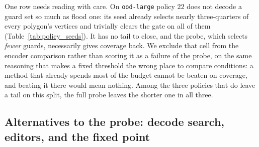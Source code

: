 \documentclass[11pt]{article}
\newcommand{\Covf}[1]{\mathrm{Cov}_P(#1)}
\newcommand{\OPT}{\mathrm{OPT}}
\begin{document}
One row needs reading with care. On \texttt{ood-large} policy $22$ does not decode a guard set so much as flood one: its seed already selects nearly three-quarters of every polygon's vertices and trivially clears the gate on all of them (Table~\ref{tab:policy_seeds}). It has no tail to close, and the probe, which selects \emph{fewer} guards, necessarily gives coverage back. We exclude that cell from the encoder comparison rather than scoring it as a failure of the probe, on the same reasoning that makes a fixed threshold the wrong place to compare conditions: a method that already spends most of the budget cannot be beaten on coverage, and beating it there would mean nothing. Among the three policies that do leave a tail on this split, the full probe leaves the shorter one in all three.

\begin{table}[!ht]
  \centering
  \footnotesize
  \caption{Replication across the three PO/BT policies trained from scratch under the same recipe (seeds $11$, $22$, $33$), $t = 0.20$, coverage by exact CGAL. Each policy has its own full and no-encoder probe trained on its own targets; the released policy ($1234$) is tabulated in Tables~\ref{tab:headline}, \ref{tab:ood} and~\ref{tab:large} and is not repeated here. ``gate'' is $\#\{\Covf{S} \ge 0.95\}/N$. $^{\dagger}$On \texttt{ood-large} the $|S|/\OPT$ column averages only the $206$ of $285$ polygons that have a vertex-guard optimum, so it is not comparable across splits; the other columns cover all $285$. At this fixed threshold the coverage and cost columns are interdependent; the encoder conclusion is drawn at matched budget (Table~\ref{tab:ablation_thresholds}) rather than from this table.}
  \label{tab:policy_seeds}
\end{table}

\subsection{Alternatives to the probe: decode search, editors, and the fixed point}
\label{sec:res-iteration}
\end{document}

